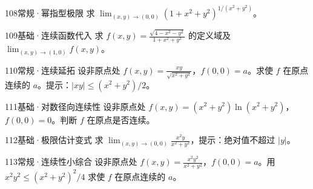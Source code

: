 \begin{exercise}{108}{常规·幂指型极限}
求 $\lim_{(x,y)\to(0,0)}(1+x^2+y^2)^{1/(x^2+y^2)}$。
\end{exercise}
\begin{exercise}{109}{基础·连续函数代入}
求 $f(x,y)=\frac{\sqrt{4-x^2-y^2}}{1+x^2+y^2}$ 的定义域及 $\lim_{(x,y)\to(1,0)}f(x,y)$。
\end{exercise}
\begin{exercise}{110}{常规·连续延拓}
设非原点处 $f(x,y)=\frac{xy}{\sqrt{x^2+y^2}}$，$f(0,0)=a$。求使 $f$ 在原点连续的 $a$。提示：$|xy|\le(x^2+y^2)/2$。
\end{exercise}
\begin{exercise}{111}{基础·对数径向连续性}
设非原点处 $f(x,y)=(x^2+y^2)\ln(x^2+y^2)$，$f(0,0)=0$。判断 $f$ 在原点是否连续。
\end{exercise}
\begin{exercise}{112}{基础·极限估计变式}
求 $\lim_{(x,y)\to(0,0)}\frac{x^2y}{x^2+y^2}$，提示：绝对值不超过 $|y|$。
\end{exercise}
\begin{exercise}{113}{常规·连续性小综合}
设非原点处 $f(x,y)=\frac{x^2y^2}{x^2+y^2}$，$f(0,0)=a$。用 $x^2y^2\le(x^2+y^2)^2/4$ 求使 $f$ 在原点连续的 $a$。
\end{exercise}
